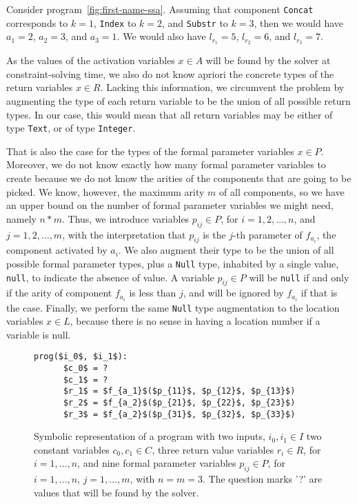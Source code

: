 \begin{example}
  Consider program~\ref{fig:first-name-ssa}.
  Assuming that component \lstinline{Concat} corresponds to $k = 1$,
  \lstinline{Index} to $k = 2$, and \lstinline{Substr} to $k = 3$, then we would
  have $a_1 = 2 $, $a_2 = 3$, and $a_3 = 1$.
  We would also have $l_{r_1} = 5$, $l_{r_2} = 6$, and $l_{r_3} = 7$.
\end{example}

As the values of the activation variables $x \in A$ will be found by the solver
at constraint-solving time, we also do not know apriori the concrete types of
the return variables $x \in R$.
Lacking this information, we circumvent the problem by augmenting the type of
each return variable to be the union of all possible return types.
In our case, this would mean that all return variables may be either of type
\lstinline{Text}, or of type \lstinline{Integer}.

That is also the case for the types of the formal parameter variables $x \in P$.
Moreover, we do not know exactly how many formal parameter variables to create
because we do not know the arities of the components that are going to be picked.
We know, however, the maximum arity $m$ of all components, so we have an upper
bound on the number of formal parameter variables we might need, namely
$n * m$.
Thus, we introduce variables $p_{ij} \in P$, for $i = 1, 2, \ldots, n$, and
$j = 1, 2, \ldots, m$, with the interpretation that $p_{ij}$ is the $j$-th
parameter of $f_{a_i}$, the component activated by $a_i$.
We also augment their type to be the union of all possible formal parameter
types, plus a \lstinline{Null} type, inhabited by a single value,
\lstinline{null}, to indicate the absence of value.
A variable $p_{ij} \in P$ will be \lstinline{null} if and only if the arity of
component $f_{a_i}$ is less than $j$, and will be ignored by $f_{a_i}$ if that
is the case.
Finally, we perform the same \lstinline{Null} type augmentation to the location
variables $x \in L$, because there is no sense in having a location number if a
variable is null.

\begin{figure}
  \begin{lstlisting}[frame=tlrb,mathescape=true]
    prog($i_0$, $i_1$):
      $c_0$ = ?
      $c_1$ = ?
      $r_1$ = $f_{a_1}$($p_{11}$, $p_{12}$, $p_{13}$)
      $r_2$ = $f_{a_2}$($p_{21}$, $p_{22}$, $p_{23}$)
      $r_3$ = $f_{a_2}$($p_{31}$, $p_{32}$, $p_{33}$)
  \end{lstlisting}
\caption{Symbolic representation of a program with two inputs, $i_0, i_1 \in I$
  two constant variables $c_0, c_1 \in C$, three return value variables $r_i \in
  R$, for $i = 1, \ldots, n$, and nine formal parameter variables $p_{ij} \in
  P$, for $i = 1, \ldots, n$, $j = 1, \ldots, m$, with $n = m = 3$.
  The question marks '?' are values that will be found by the solver.}
\label{fig:whole-encoding-prog}
\end{figure}

